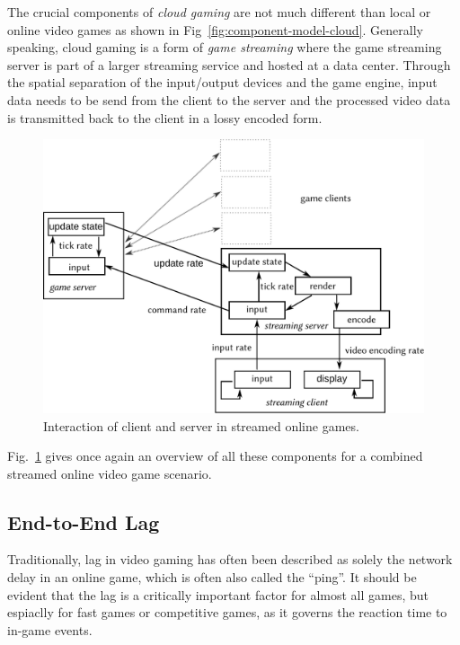 The crucial components of \textit{cloud gaming} are not much different than local or online video games as shown in Fig~\ref{fig:component-model-cloud}. Generally speaking, cloud gaming is a form of \textit{game streaming} where the game streaming server is part of a larger streaming service and hosted at a data center. Through the spatial separation of the input/output devices and the game engine, input data needs to be send from the client to the server and the processed video data is transmitted back to the client in a lossy encoded form.

\begin{figure}[!t]
	\centering
	\includegraphics[width=1.0\columnwidth]{../models/game-tick-rate-streamed.pdf}
	\caption{Interaction of client and server in streamed online games.}
\label{fig:tickrate-streamed}
\end{figure}

Fig.~\ref{fig:tickrate-streamed} gives once again an overview of all these components for a combined streamed online video game scenario.


\subsection{End-to-End Lag}

Traditionally, lag in video gaming has often been described as solely the network delay in an online game, which is often also called the ``ping''. It should be evident that the lag is a critically important factor for almost all games, but espiaclly for fast games or competitive games, as it governs the reaction time to in-game events.

